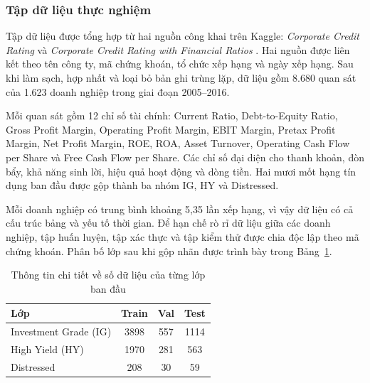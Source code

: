 \documentclass[10pt,twoside]{article}
\begin{document}
\subsubsection{Tập dữ liệu thực nghiệm}
Tập dữ liệu được tổng hợp từ hai nguồn công khai trên Kaggle: \textit{Corporate Credit Rating} \cite{noauthor_corporate_credit_rating_nodate} và \textit{Corporate Credit Rating with Financial Ratios} \cite{noauthor_corporate_financial_ratios_nodate}. Hai nguồn được liên kết theo tên công ty, mã chứng khoán, tổ chức xếp hạng và ngày xếp hạng. Sau khi làm sạch, hợp nhất và loại bỏ bản ghi trùng lặp, dữ liệu gồm 8.680 quan sát của 1.623 doanh nghiệp trong giai đoạn 2005--2016.

Mỗi quan sát gồm 12 chỉ số tài chính: Current Ratio, Debt-to-Equity Ratio, Gross Profit Margin, Operating Profit Margin, EBIT Margin, Pretax Profit Margin, Net Profit Margin, ROE, ROA, Asset Turnover, Operating Cash Flow per Share và Free Cash Flow per Share. Các chỉ số đại diện cho thanh khoản, đòn bẩy, khả năng sinh lời, hiệu quả hoạt động và dòng tiền. Hai mươi mốt hạng tín dụng ban đầu được gộp thành ba nhóm IG, HY và Distressed.

Mỗi doanh nghiệp có trung bình khoảng 5,35 lần xếp hạng, vì vậy dữ liệu có cả cấu trúc bảng và yếu tố thời gian. Để hạn chế rò rỉ dữ liệu giữa các doanh nghiệp, tập huấn luyện, tập xác thực và tập kiểm thử được chia độc lập theo mã chứng khoán. Phân bố lớp sau khi gộp nhãn được trình bày trong Bảng~\ref{tab:class_distribution}. 
\begin{table}[!htbp] 
\centering 
\caption{Thông tin chi tiết về số dữ liệu của từng lớp ban đầu} 
\label{tab:class_distribution} 
\begin{tabular}{lccc} 
\hline \textbf{Lớp} & \textbf{Train} & \textbf{Val} & \textbf{Test} \\ \hline Investment Grade (IG) & 3898 & 557 & 1114 \\ High Yield (HY) & 1970 & 281 & 563 \\ Distressed & 208 & 30 & 59 \\ \hline 
\end{tabular} 
\end{table}
\end{document}
